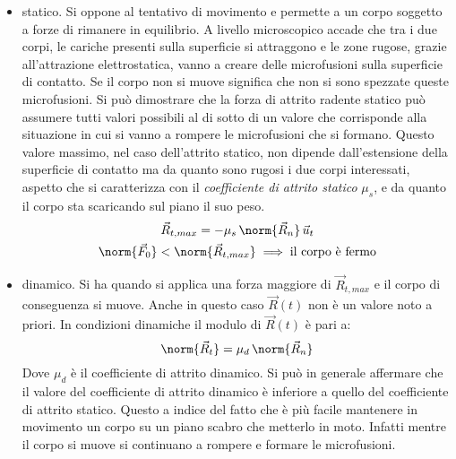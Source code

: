 \begin{itemize}
	\item statico. Si oppone al tentativo di movimento e permette a un corpo soggetto a forze di rimanere in equilibrio. A livello microscopico accade che tra i due corpi, le cariche presenti sulla superficie si attraggono e le zone rugose, grazie all'attrazione elettrostatica, vanno a creare delle microfusioni sulla superficie di contatto. Se il corpo non si muove significa che non si sono spezzate queste microfusioni. Si può dimostrare che la forza di attrito radente statico può assumere tutti valori possibili al di sotto di un valore che corrisponde alla situazione in cui si vanno a rompere le microfusioni che si formano. Questo valore massimo, nel caso dell'attrito statico, non dipende dall'estensione della superficie di contatto ma da quanto sono rugosi i due corpi interessati, aspetto che si caratterizza con il \emph{coefficiente di attrito statico} $\mu_s$, e da quanto il corpo sta scaricando sul piano il suo peso.
	\begin{gather*}
		\vec{R}_{t, max}=-\mu_s\,\norm{\vec{R}_n}\,\vec{u}_t \\
		\norm{\vec{F}_0}<\norm{\vec{R}_{t, max}} \implies \text{il corpo è fermo}
	\end{gather*}
	\item dinamico. Si ha quando si applica una forza maggiore di $\vec{R}_{t, max}$ e il corpo di conseguenza si muove. Anche in questo caso $\vec{R}(t)$ non è un valore noto a priori. In condizioni dinamiche il modulo di $\vec{R}(t)$ è pari a:
	\[
		\norm{\vec{R}_t}=\mu_d\,\norm{\vec{R}_{n}}
	\]
	Dove $\mu_d$ è il coefficiente di attrito dinamico. Si può in generale affermare che il valore del coefficiente di attrito dinamico è inferiore a quello del coefficiente di attrito statico. Questo a indice del fatto che è più facile mantenere in movimento un corpo su un piano scabro che metterlo in moto. Infatti mentre il corpo si muove si continuano a rompere e formare le microfusioni.
\end{itemize}

